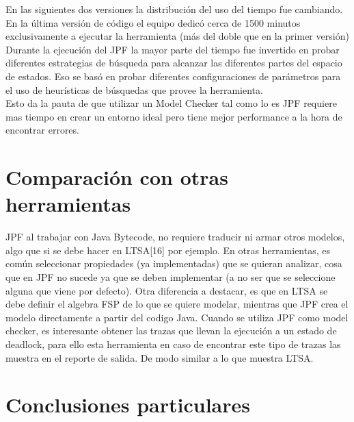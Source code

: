 \documentclass[runningheads]{llncs}
\begin{document}
En las siguientes dos versiones la distribuci\'on del uso del tiempo fue cambiando. En la \'ultima versi\'on de c\'odigo el equipo dedic\'o cerca de 1500 minutos exclusivamente a ejecutar la herramienta (m\'as del doble que en la primer versi\'on)
Durante la ejecuci\'on del JPF la mayor parte del tiempo fue invertido en probar diferentes estrategias de b\'usqueda para alcanzar las diferentes partes del espacio de estados. Eso se bas\'o en probar diferentes configuraciones de par\'ametros para el uso de heur\'isticas de b\'usquedas que provee la herramienta.\\
Esto da la pauta de que utilizar un Model Checker tal como lo es JPF requiere mas tiempo en crear un entorno ideal pero tiene mejor performance a la hora de encontrar errores.


\section{Comparaci\'on con otras herramientas}

JPF al trabajar con Java Bytecode, no requiere traducir ni armar otros modelos, algo que si se debe hacer en LTSA[16] por ejemplo. En otras herramientas, es com\'un seleccionar propiedades (ya implementadas) que se quieran analizar, cosa que en JPF no sucede ya que se deben implementar (a no ser que se seleccione alguna que viene por defecto).
Otra diferencia a destacar, es que en LTSA se debe definir el algebra FSP de lo que se quiere modelar, mientras que JPF crea el modelo directamente a partir del codigo Java.
Cuando se utiliza JPF como model checker, es interesante obtener las trazas que llevan la ejecuci\'on a un estado de deadlock, para ello esta herramienta en caso de encontrar este tipo de trazas las muestra en el reporte de salida. De modo similar a lo que muestra LTSA.


\section{Conclusiones particulares}
\end{document}
